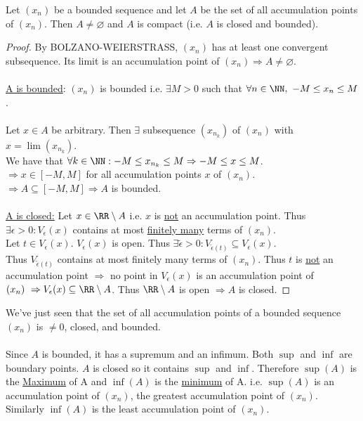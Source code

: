 \documentclass[class=scrartcl, crop=false]{standalone}
\begin{document}
\begin{theorem}
  Let $(x_n)$ be a bounded sequence and let $A$ be the set of all accumulation points of $(x_n)$. Then $A \neq \varnothing$ and $A$ is compact (i.e. $A$ is closed and bounded).
  \begin{proof}
    By BOLZANO-WEIERSTRASS, $(x_n)$ has at least one convergent subsequence. Its limit is an accumulation point of $(x_n) \Rightarrow A \neq \varnothing$.
    \\\\
    \ul{A is bounded}:  $(x_n)$ is bounded i.e. $\exists M > 0$ such that $\forall n \in \NN, \ -M \leq x_n \leq M$.
    \\\\
    Let $x \in A$ be arbitrary. Then $\exists$ subsequence $(x_{n_k})$ of $(x_n)$ with $x = \lim(x_{n_k})$.
    \\
    We have that $\forall k \in \NN : -M \leq x_{n_k} \leq M \Rightarrow -M \leq x \leq M$.
    \\
    $\Rightarrow x \in [-M, M]$ for all accumulation points $x$ of $(x_n)$.
    \\
    $\Rightarrow A \subseteq [-M, M] \Rightarrow A$ is bounded.
    \\\\
    \ul{A is closed:} Let $x \in \RR \setminus A$ i.e. $x$ is \ul{not} an accumulation point. Thus $\exists \epsilon > 0 : V_\epsilon(x)$  contains at most \ul{finitely many} terms of $(x_n)$.
    \\
    Let $t \in V_\epsilon(x)$. $V_\epsilon(x)$ is open. Thus $\exists \tilde{\epsilon} > 0: V_{\tilde{\epsilon}(t)} \subseteq V_\epsilon(x)$.
    \\
    Thus $V_{\tilde{\epsilon}(t)}$ contains at most finitely many terms of $(x_n)$. Thus $t$ is \ul{not} an accumulation point $\Rightarrow$ no point in $V_\epsilon(x)$ is an accumulation point of $(x_n) \ \Rightarrow V_\epsilon(x) \subseteq \RR \setminus A$. Thus $\RR \setminus A$ is open $\Rightarrow A$ is closed.

  \end{proof}
\end{theorem}
We've just seen that the set of all accumulation points of a bounded sequence $(x_n)$ is $\neq 0$, closed, and bounded. 
\\
\\
Since $A$ is bounded, it has a supremum and an infimum. Both $\sup$ and $\inf$ are boundary points. $A$ is closed so it contains $\sup$ and $\inf$. Therefore $\sup(A)$ is the  \ul{Maximum} of A and $\inf(A)$ is the \ul{minimum} of A. i.e. $\sup(A)$ is an accumulation point of $(x_n)$, the greatest accumulation point of $(x_n)$. Similarly $\inf(A)$ is the least accumulation point of $(x_n)$.
\end{document}
